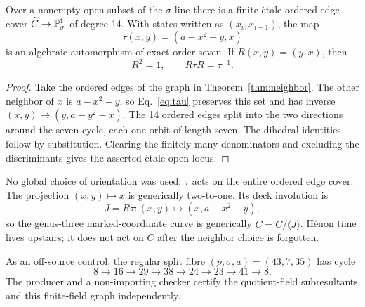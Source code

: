 \begin{corollary}\label{cor:edgecover}
Over a nonempty open subset of the $\sigma$-line there is a finite \`etale
ordered-edge cover $\widetilde C\to\mathbb P^1_\sigma$ of degree 14.  With states
written as $(x_i,x_{i-1})$, the map
\begin{equation}\label{eq:tau}
 \tau(x,y)=(a-x^2-y,x)
\end{equation}
is an algebraic automorphism of exact order seven.  If
$R(x,y)=(y,x)$, then
\[
 R^2=1,\qquad R\tau R=\tau^{-1}.
\]
\end{corollary}

\begin{proof}
Take the ordered edges of the graph in Theorem~\ref{thm:neighbor}.  The other
neighbor of $x$ is $a-x^2-y$, so Eq.~\eqref{eq:tau} preserves this set and has
inverse $(x,y)\mapsto(y,a-y^2-x)$.  The 14 ordered edges split into the two
directions around the seven-cycle, each one orbit of length seven.  The
dihedral identities follow by substitution.  Clearing the finitely many
denominators and excluding the discriminants gives the asserted \`etale open
locus.
\end{proof}

No global choice of orientation was used: $\tau$ acts on the entire ordered
edge cover.  The projection $(x,y)\mapsto x$ is generically two-to-one.  Its
deck involution is
\[
 J=R\tau:(x,y)\longmapsto(x,a-x^2-y),
\]
so the genus-three marked-coordinate curve is generically
$C=\widetilde C/\langle J\rangle$.  H\'enon time lives upstairs; it does not
act on $C$ after the neighbor choice is forgotten.

As an off-source control, the regular split fibre
$(p,\sigma,a)=(43,7,35)$ has cycle
\[
8\longrightarrow16\longrightarrow29\longrightarrow38
\longrightarrow24\longrightarrow23\longrightarrow41\longrightarrow8.
\]
The producer and a non-importing checker certify the quotient-field
subresultants and this finite-field graph independently.
